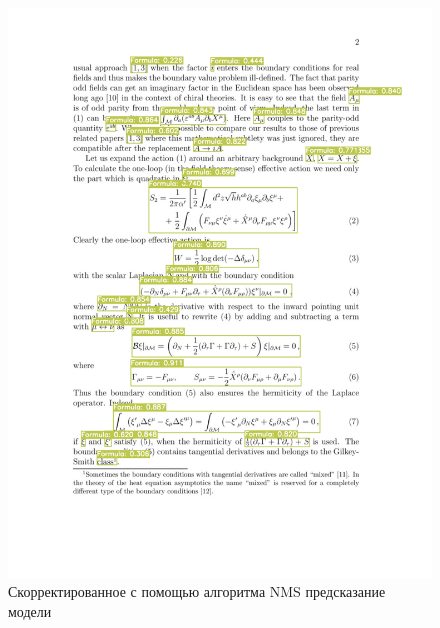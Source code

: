 \begin{figure}
    \includegraphics[scale=0.75]{img/train/nms.png}
    \caption{Скорректированное с помощью алгоритма NMS предсказание модели}
    \label{nms_img}
\end{figure}